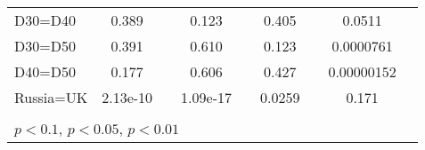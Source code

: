 \begin{tabular}{l|cccccc|cc}
D30=D40         &    0.389         &         &    0.123         &         &    0.405         &         &   0.0511         &         \\
D30=D50         &    0.391         &         &    0.610         &         &    0.123         &         &0.0000761         &         \\
D40=D50         &    0.177         &         &    0.606         &         &    0.427         &         &0.00000152         &         \\
Russia=UK       & 2.13e-10         &         & 1.09e-17         &         &   0.0259         &         &    0.171         &         \\
\hline\hline
\multicolumn{9}{p{16cm}}{\tiny }\\
\multicolumn{9}{l}{\tiny \sym{*} \(p<0.1\), \sym{**} \(p<0.05\), \sym{***} \(p<0.01\)}\\
\end{tabular}